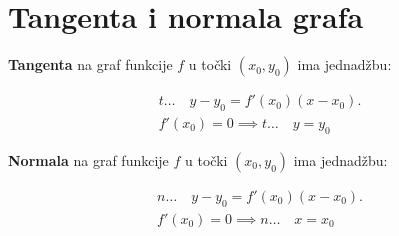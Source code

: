 \section{Tangenta i normala grafa}

\textbf{Tangenta} na graf funkcije $f$ u točki $(x_0,y_0)$ ima jednadžbu:

\begin{gather*}
t\dots\quad y-y_0=f'(x_0)(x-x_0).\\
f'(x_0)=0\implies t\dots\quad y = y_0
\end{gather*}

\noindent
\textbf{Normala} na graf funkcije $f$ u točki $(x_0,y_0)$ ima jednadžbu:

\begin{gather*}
n\dots\quad y-y_0=f'(x_0)(x-x_0).\\
f'(x_0)=0\implies n\dots\quad x = x_0
\end{gather*}
